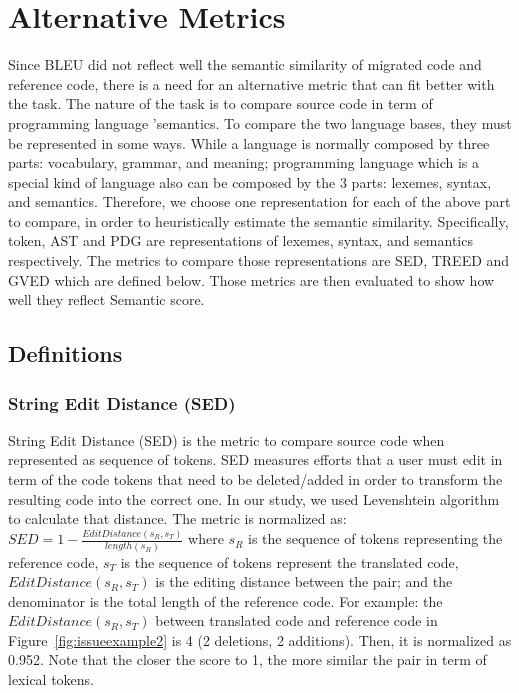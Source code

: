 \section{Alternative Metrics}
Since BLEU did not reflect well the semantic similarity of migrated code and reference code, there is a need for an alternative metric that can fit better with the task. The nature of the task is to compare source code in term of programming language \rq semantics. To compare the two language bases, they must be represented in some ways. While a language is normally composed by three parts: vocabulary, grammar, and meaning; programming language which is a special kind of language also can be composed by the 3 parts: lexemes, syntax, and semantics. Therefore, we choose one representation for each of the above part to compare, in order to heuristically estimate the semantic similarity. Specifically, token, AST and PDG are representations of lexemes, syntax, and semantics respectively. The metrics to compare those representations are SED, TREED and GVED which are defined below. Those metrics are then evaluated to show how well they reflect Semantic score.
\subsection{Definitions}
\subsubsection{\textbf{String Edit Distance (SED)}}String Edit Distance (SED) is the metric to compare source code when represented as sequence of tokens. SED
measures efforts that a user must edit in term of the code tokens that
need to be deleted/added in order to transform the resulting code into
the correct one. In our study, we used Levenshtein algorithm to
calculate that distance. The metric is normalized as: $SED = 1 -
\frac{EditDistance\left(s_R, s_T\right)}{length\left(s_R\right)}$
where $s_R$ is the sequence of tokens representing the reference code,
$s_T$ is the sequence of tokens represent the translated code,
$EditDistance\left(s_R, s_T\right)$ is the editing distance between
the pair; and the denominator is the total length of the reference
code. For example: the $EditDistance\left(s_R, s_T\right)$ between
translated code and reference code in Figure~\ref{fig:issueexample2}
is 4 (2 deletions, 2 additions). Then, it is normalized as 0.952. Note
that the closer the score to 1, the more similar the pair in term of
lexical tokens.




 
